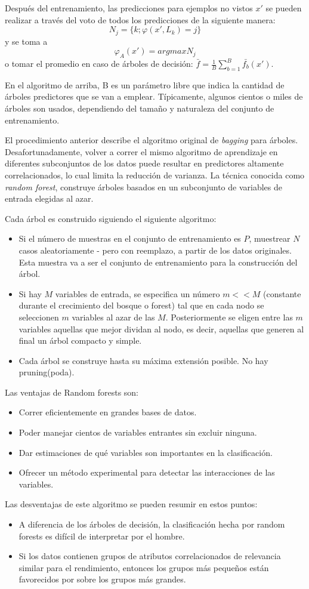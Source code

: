 	Después del entrenamiento, las predicciones para ejemplos no vistos $x'$ se pueden realizar a través del voto de todos los predicciones de la siguiente manera:
	$$N_j = \{ k;\varphi(x', L_k) = j \}$$
	y se toma a
	$$\varphi_A(x') = argmax N_j$$
	o tomar el promedio en caso de árboles de decisión: $\bar{f} = \frac{1}{B}\sum_{b=1}^B\bar{f_b}(x')$.

	En el algoritmo de arriba, B es un parámetro libre que indica la cantidad de árboles predictores que se van a emplear. Típicamente, algunos cientos o miles de árboles son usados, dependiendo del tamaño y naturaleza del conjunto de entrenamiento.

	El procedimiento anterior describe el algoritmo original de \textit{bagging} para árboles. Desafortunadamente, volver a correr el mismo algoritmo de aprendizaje en diferentes subconjuntos de los datos puede resultar en predictores altamente correlacionados, lo cual limita la reducción de varianza. La técnica conocida como \textit{random forest}, construye árboles basados en un subconjunto de variables de entrada elegidas al azar.

	Cada árbol es construido siguiendo el siguiente algoritmo:
	\begin{itemize}
		\item Si el número de muestras en el conjunto de entrenamiento es $P$, muestrear $N$ casos aleatoriamente - pero con reemplazo, a partir de los datos originales. Esta muestra va a ser el conjunto de entrenamiento para la construcción del árbol.
		\item Si hay $M$ variables de entrada, se especifica un número $m<<M$ (constante durante el crecimiento del bosque o forest) tal que en cada nodo se seleccionen $m$ variables al azar de las $M$. Posteriormente se eligen entre las $m$ variables aquellas que mejor dividan al nodo, es decir, aquellas que generen al final un árbol compacto y simple.
		\item Cada árbol se construye hasta su máxima extensión posible. No hay pruning(poda).
	\end{itemize}
	Las ventajas de Random forests son:
	\begin{itemize}
		\item Correr eficientemente en grandes bases de datos.
		\item Poder manejar cientos de variables entrantes sin excluir ninguna.
		\item Dar estimaciones de qué variables son importantes en la clasificación.
		\item Ofrecer un método experimental para detectar las interacciones de las variables.
	\end{itemize}
	Las desventajas de este algoritmo se pueden resumir en estos puntos:
	\begin{itemize}
		\item A diferencia de los árboles de decisión, la clasificación hecha por random forests es difícil de interpretar por el hombre.
		\item Si los datos contienen grupos de atributos correlacionados de relevancia similar para el rendimiento, entonces los grupos más pequeños están favorecidos por sobre los grupos más grandes.
	\end{itemize}
	
